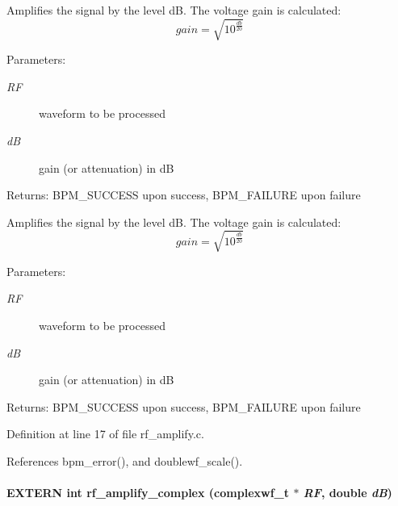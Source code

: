 Amplifies the signal by the level dB. The voltage gain is calculated: \[ gain = \sqrt{ 10^{ \frac{db}{20} } } \] \begin{Desc}
\item[Parameters:]
\begin{description}
\item[{\em RF}]waveform to be processed \item[{\em dB}]gain (or attenuation) in dB \end{description}
\end{Desc}
\begin{Desc}
\item[Returns:]BPM\_\-SUCCESS upon success, BPM\_\-FAILURE upon failure\end{Desc}
Amplifies the signal by the level dB. The voltage gain is calculated: \[ gain = \sqrt{ 10^{ \frac{db}{20} } } \] \begin{Desc}
\item[Parameters:]
\begin{description}
\item[{\em RF}]waveform to be processed \item[{\em dB}]gain (or attenuation) in dB \end{description}
\end{Desc}
\begin{Desc}
\item[Returns:]BPM\_\-SUCCESS upon success, BPM\_\-FAILURE upon failure \end{Desc}


Definition at line 17 of file rf\_\-amplify.c.

References bpm\_\-error(), and doublewf\_\-scale().
\paragraph[rf\_\-amplify\_\-complex]{\setlength{\rightskip}{0pt plus 5cm}EXTERN int rf\_\-amplify\_\-complex ({\bf complexwf\_\-t} $\ast$ {\em RF}, \/  double {\em dB})}\hfill\label{group__rf_g4d6099ae470e3ae822af20a03c8f4abb}


